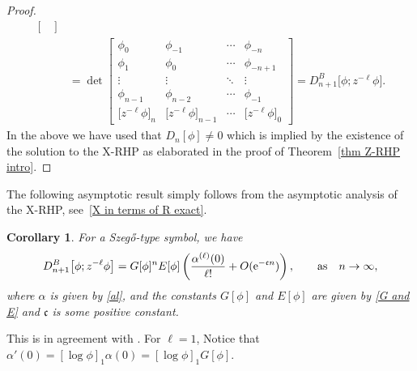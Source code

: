 \documentclass[pdftex]{sigma}
\numberwithin{equation}{section}
\newtheorem{Corollary}[Theorem]{Corollary}
\newcommand{\al}{\alpha}
\newcommand{\qasq}{\qquad \text{as} \quad}
\begin{document}
\begin{proof}
\begin{equation*}
\begin{split}
\begin{bmatrix}
				\end{bmatrix} \\ & = \det \begin{bmatrix}
					\phi_0 & \phi_{-1} & \cdots & \phi_{-n} \\
					\phi_1 & \phi_{0} & \cdots & \phi_{-n+1} \\
					\vdots & \vdots & \ddots & \vdots \\
					\phi_{n-1} & \phi_{n-2} & \cdots & \phi_{-1} \\
					\big[z^{-\ell}\phi\big]_n & \big[z^{-\ell}\phi\big]_{n-1} & \cdots & \big[z^{-\ell}\phi\big]_0
				\end{bmatrix} = D^B_{n+1}\big[\phi;z^{-\ell}\phi\big].
			\end{split}
		\end{equation*}
		In the above we have used that $D_n[\phi] \neq 0$ which is implied by the existence of the solution to the X-RHP as elaborated in the proof of Theorem~\ref{thm Z-RHP intro}.
	\end{proof}

	The following asymptotic result simply follows from the asymptotic analysis of the X-RHP, see~\eqref{X in terms of R exact}.
	
	\begin{Corollary}\label{Cor phi z^{-l}phi}
		For a Szeg\H{o}-type symbol, we have
		\begin{equation*}
			D^B_{n+1}\big[\phi;z^{-\ell}\phi\big] = G[\phi]^{n} E[\phi] \left( \frac{\al^{(\ell)}(0)}{\ell!} + O({\rm e}^{-\mathfrak{c}n}) \right), \qasq n \to \infty,
		\end{equation*}
		where $\al$ is given by \eqref{al}, and the constants $G[\phi]$ and $E[\phi]$ are given by \eqref{G and E} and $\mathfrak{c}$ is some positive constant.
	\end{Corollary}	
	
	
	
	\begin{Remark}
		\normalfont This is in agreement with \cite[Lemma 2.7]{BEGIL}. For $\ell=1$, Notice that $\al'(0)= [\log \phi]_1 \al(0) = [\log \phi]_1 G[\phi]$.
	\end{Remark}
	
\end{document}
